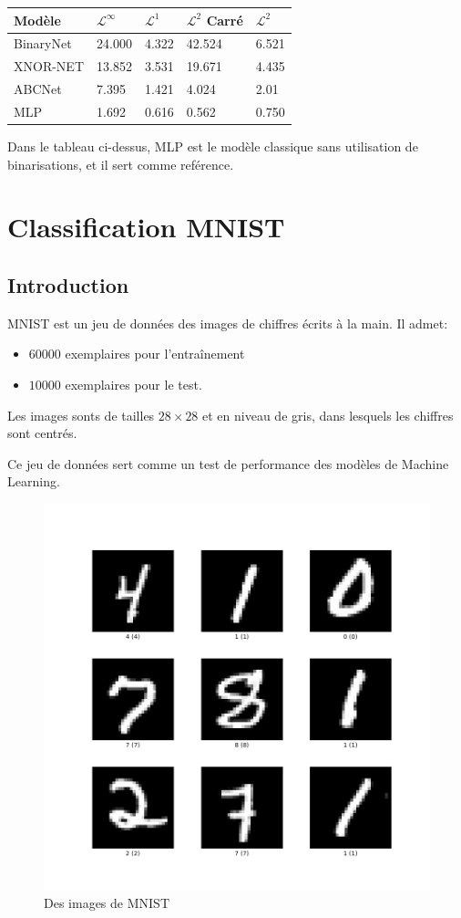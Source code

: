 \begin{tabularx}{\textwidth}{| X | X | X | X | X |}
	\hline
	
	Modèle & $\mathscr{L}^\infty$ & $\mathscr{L}^1$ & $\mathscr{L}^2$ Carré & $\mathscr{L}^2$  \\
	\hline
	BinaryNet & 24.000 & 4.322 & 42.524 & 6.521 \\
	\hline 
	XNOR-NET & 13.852 & 3.531 & 19.671 & 4.435 \\
	\hline
	ABCNet & 7.395 & 1.421 & 4.024 & 2.01 \\
	\hline
	MLP & 1.692 & 0.616 & 0.562 & 0.750 \\
	\hline
\end{tabularx}
Dans le tableau ci-dessus, MLP est le modèle classique sans utilisation de binarisations, et il sert comme reférence.

\FloatBarrier
\newpage
\section{Classification MNIST}
\subsection{Introduction}
MNIST\cite{12} est un jeu de données des images de chiffres écrits à la main. Il admet:
\begin{itemize}
	\item $60000$ exemplaires pour l'entraînement
	\item $10000$ exemplaires pour le test.  
\end{itemize}
Les images sonts de tailles $28\times 28$ et en niveau de gris, dans lesquels les chiffres sont centrés.

Ce jeu de données sert comme un test de performance des modèles de Machine Learning.

\begin{figure}[h!]
	\centering
	\includegraphics[width=.4\textwidth]{Figures/mnist-3.0.1.png}
	\caption{Des images de MNIST}
	\label{fig:MNIST-Sample}
\end{figure}

